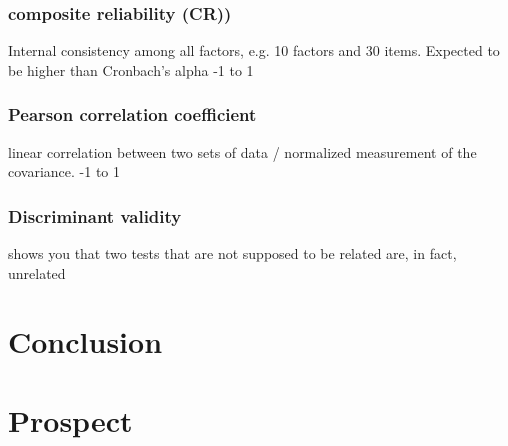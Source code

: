 \subsection{composite reliability (CR))}
Internal consistency among all factors, e.g. 10 factors and 30 items.
Expected to be higher than Cronbach's alpha
-1 to 1

\subsection{Pearson correlation coefficient}
linear correlation between two sets of data / normalized measurement of the covariance. 
-1 to 1

\subsection{Discriminant validity}
shows you that two tests that are not supposed to be related are, in fact, unrelated









\chapter{Conclusion}

\chapter{Prospect}

